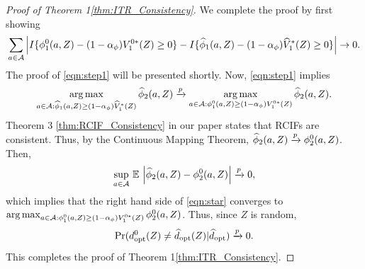 {\begin{proof}[Proof of Theorem \ifnum{} 1\else \ref{thm:ITR_Consistency}\fi]
We complete the proof by first showing
\begin{align}
    \label{eqn:step1}
        \sum_{a \in \mathcal{A}} \left| I\{ \phi_1^0(a,Z) - (1-\alpha_{\phi})V_1^{0*}(Z) \ge 0 \} - I\{ \widehat{\phi}_1(a,Z) - (1-\alpha_{\phi})\widehat{V}_1^*(Z) \ge 0 \} \right| \rightarrow 0.
        \end{align}
The proof of \cref{eqn:step1} will be presented shortly. Now, \cref{eqn:step1} implies 
\begin{align}
    \label{eqn:star}
        \operatorname*{arg\,max}_{a \in \mathcal{A}: \widehat{\phi}_1(a,Z) \ge (1-\alpha_{\phi})\widehat{V}_1^*(Z)} \widehat{\phi}_2(a,Z) \xrightarrow{p} \operatorname*{arg\,max}_{a \in \mathcal{A}: \phi_1^0(a,Z) \ge (1-\alpha_{\phi})V_1^{0*}(Z)} \widehat{\phi}_2(a,Z).
    \end{align} 
Theorem \ifnum {} 3 \else \ref{thm:RCIF_Consistency} \fi in our paper states that RCIFs are consistent. %
Thus, by the Continuous Mapping Theorem, $\widehat{\phi}_2(a,Z) \xrightarrow{p} \phi_2^0(a,Z)$. %
Then,
\begin{align}
\label{eqn:step2}
        \sup_{a \in \mathcal{A}} \, \mathbb{E} \, \left| \widehat{\phi}_2(a,Z) - \phi_2^0(a,Z) \right| \xrightarrow{p} 0,
    \end{align} 
which implies that the right hand side of \cref{eqn:star} converges to \\$\operatorname*{arg\,max}_{a \in \mathcal{A}: \phi_1^0(a,Z) \ge (1-\alpha_{\phi})V_1^{0*}(Z)} \phi_2^0(a,Z)$. Thus, since $Z$ is random, $$\text{Pr}(d^0_{\text{opt}}(Z) \neq \widehat{d}_{\text{opt}}(Z) | \widehat{d}_{\text{opt}}) \xrightarrow{p} 0.$$ This completes the proof of Theorem \ifnum{} 1\else \ref{thm:ITR_Consistency}\fi.
\end{proof}
}

